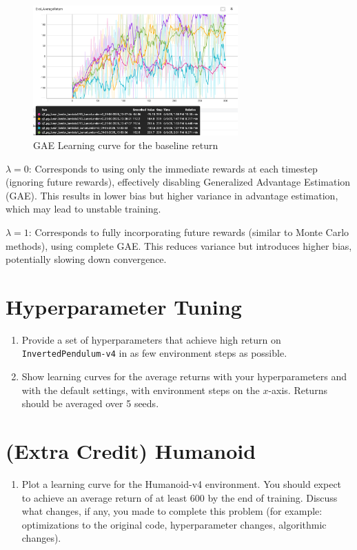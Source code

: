 \documentclass{article}
\begin{document}
\begin{figure}[H]
    \centering
    \includegraphics[width=0.7\textwidth]{img/GAE_return.png}
    \caption{GAE Learning curve for the baseline return}
    \label{fig:GAE_return}
\end{figure}

$\lambda = 0$: Corresponds to using only the immediate rewards at each timestep (ignoring future rewards), effectively disabling Generalized Advantage Estimation (GAE). This results in lower bias but higher variance in advantage estimation, which may lead to unstable training.

$\lambda = 1$: Corresponds to fully incorporating future rewards (similar to Monte Carlo methods), using complete GAE. This reduces variance but introduces higher bias, potentially slowing down convergence.

\newpage\section{Hyperparameter Tuning}
\begin{enumerate}
    \item Provide a set of hyperparameters that achieve high return on \verb|InvertedPendulum-v4| in as few environment steps as possible.
    \item Show learning curves for the average returns with your hyperparameters and with the default settings, with environment steps on the $x$-axis. Returns should be averaged over 5 seeds.
\end{enumerate}

\newpage\section{(Extra Credit) Humanoid}
\begin{enumerate}
    \item Plot a learning curve for the Humanoid-v4 environment. You should expect to achieve an average return of at least 600 by the end of training. Discuss what changes, if any, you made to complete this problem (for example: optimizations to the original code, hyperparameter changes, algorithmic changes).
\end{enumerate}
\end{document}
